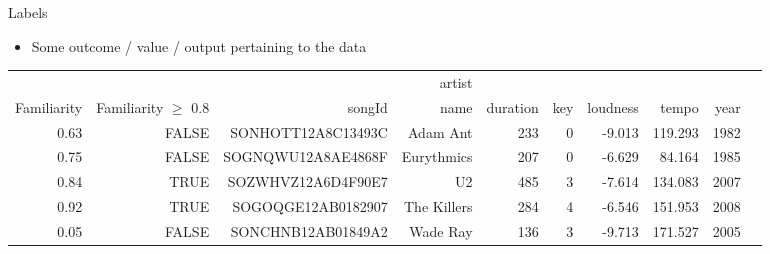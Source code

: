 \documentclass[aspectratio=169]{beamer}
\begin{document}
\begin{frame}{Labels}

\begin{itemize}
\item Some outcome / value / output pertaining to the data
\end{itemize}
{\tiny
\begin {table}[H]
\begin{tabular}{|r|r||r|r|r|r|r|r|r|r|}
\hline
 & & 	& artist &  &   &  &  &   \\ 
Familiarity & Familiarity $\ge$ 0.8 & songId & name &  duration & key &  loudness & tempo & year   \\ \hline \hline
0.63 & FALSE & SONHOTT12A8C13493C  & Adam Ant & 233 & 0  & -9.013 & 119.293 & 1982 \\ \hline
0.75 & FALSE & SOGNQWU12A8AE4868F  & Eurythmics & 207 & 0  & -6.629 & 84.164 & 1985 \\ \hline
0.84 & TRUE & SOZWHVZ12A6D4F90E7  & U2 & 485 & 3  & -7.614 & 134.083 & 2007 \\ \hline
0.92 & TRUE & SOGOQGE12AB0182907  & The Killers & 284 & 4  & -6.546	 & 151.953 & 2008 \\ \hline
0.05 & FALSE & SONCHNB12AB01849A2  & Wade Ray & 136  & 3  & -9.713	 & 171.527& 2005 \\ \hline

\end{tabular}
\end{table}
}
\end{frame}
\end{document}
